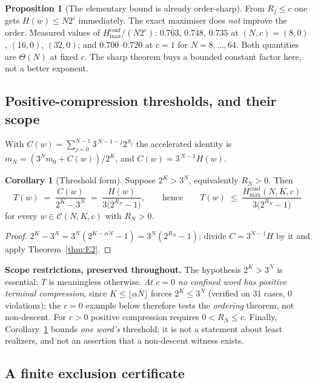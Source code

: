\documentclass[11pt,a4paper]{article}
\theoremstyle{plain}
\theoremstyle{definition}
\newcommand{\Cc}{\mathcal{C}}
\newtheorem{propE}[thmE]{Proposition}
\newtheorem{corE}[thmE]{Corollary}
\newcommand{\al}{\alpha}
\begin{document}
\begin{propE}[The elementary bound is already order-sharp]\label{prop:E8}
From $R_j\le c$ one gets $H(w)\le N2^{c}$ immediately. The exact
maximiser does \emph{not} improve the order. Measured values of
$H^{\mathrm{conf}}_{\max}/(N2^{c})$:
$0.763$, $0.748$, $0.735$ at $(N,c)=(8,0)$, $(16,0)$, $(32,0)$; and
$0.700$--$0.720$ at $c=1$ for $N=8,\dots,64$.
Both quantities are $\Theta(N)$ at fixed $c$. The sharp theorem buys a bounded
constant factor here, not a better exponent.
\end{propE}

\subsection{Positive-compression thresholds, and their scope}

With $C(w)=\sum_{j=0}^{N-1}3^{\,N-1-j}2^{S_j}$ the accelerated identity is
$m_N=(3^{N}m_0+C(w))/2^{K}$, and $C(w)=3^{\,N-1}H(w)$.

\begin{corE}[Threshold form]\label{cor:E6}
Suppose $2^{K}>3^{N}$, equivalently $R_N>0$. Then
\[
T(w)\;=\;\frac{C(w)}{2^{K}-3^{N}}\;=\;\frac{H(w)}{3\bigl(2^{R_N}-1\bigr)},
\qquad\text{hence}\qquad
T(w)\;\le\;\frac{H^{\mathrm{conf}}_{\max}(N,K,c)}{3\bigl(2^{R_N}-1\bigr)}
\]
for every $w\in\Cc(N,K,c)$ with $R_N>0$.
\end{corE}

\begin{proof}
$2^{K}-3^{N}=3^{N}(2^{K-\al N}-1)=3^{N}(2^{R_N}-1)$; divide
$C=3^{N-1}H$ by it and apply Theorem~\ref{thm:E2}.
\end{proof}

\noindent\textbf{Scope restrictions, preserved throughout.} The hypothesis
$2^{K}>3^{N}$ is essential: $T$ is meaningless otherwise. \emph{At $c=0$ no
confined word has positive terminal compression}, since $K\le\lfloor \al N
\rfloor$ forces $2^{K}\le3^{N}$ (verified on 31 cases, 0 violations); the
$c=0$ example below therefore tests the \emph{ordering} theorem, not
non-descent. For $c>0$ positive compression requires $0<R_N\le c$. Finally,
Corollary~\ref{cor:E6} bounds \emph{one word's} threshold; it is not a
statement about least realizers, and not an assertion that a non-descent
witness exists.

\subsection{A finite exclusion certificate}
\end{document}
